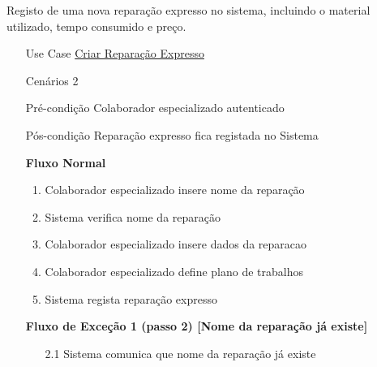 \documentclass[../relatorio.tex]{subfiles}
\begin{document}
Registo de uma nova reparação expresso no sistema, incluindo o material utilizado, tempo consumido e preço.
\begin{itemize}
    \item[Use Case] {\underline{Criar Reparação Expresso}}
    \item[Cenários] {2}
    \item[Pré-condição] {Colaborador especializado autenticado}
    \item[Pós-condição] {Reparação expresso fica registada no Sistema}
          \begin{flushleft}
              \textbf{Fluxo Normal}
          \end{flushleft}
          \begin{enumerate}
              \item Colaborador especializado insere nome da reparação
              \item Sistema verifica nome da reparação
              \item Colaborador especializado insere dados da reparacao %
              \item Colaborador especializado define plano de trabalhos
              \item Sistema regista reparação expresso
          \end{enumerate}
          \begin{flushleft}
            \textbf{Fluxo de Exceção 1 (passo 2) [Nome da reparação já existe]}
        \end{flushleft}
        \begin{itemize}
            \item[2.1] Sistema comunica que nome da reparação já existe
        \end{itemize}
\end{itemize}
\end{document}
